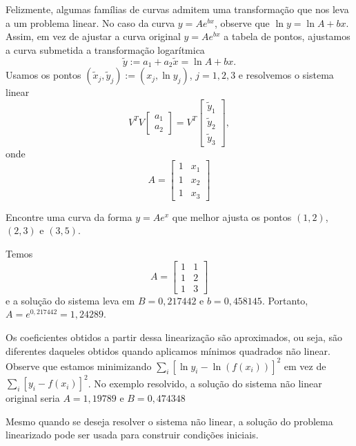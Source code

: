 Felizmente, algumas famílias de curvas admitem uma transformação que nos leva a um problema linear. No caso da curva $y=Ae^{bx}$, observe que $\ln y=\ln A+bx$. Assim, em vez de ajustar a curva original $y=Ae^{bx}$ a tabela de pontos, ajustamos a curva submetida a transformação logarítmica
$$
\tilde y:=a_1+a_2 \tilde x=\ln A+bx.
$$
Usamos os pontos $(\tilde x_j,\tilde y_j):=(x_j,\ln y_j)$, $j=1,2,3$ e resolvemos o sistema linear
$$
V^T V \left[\begin{array}{c} a_1\\a_2 \end{array}\right]=V^T\left[\begin{array}{c}\tilde{y}_1\\\tilde{y}_2\\\tilde{y}_3 \end{array}\right],
$$
onde
$$
A=\left[\begin{array}{cc} 1&x_1\\1&x_2\\1&x_3 \end{array}\right]
$$
\begin{ex}Encontre uma curva da forma $y=Ae^x$ que melhor ajusta os pontos $(1, 2)$, $(2, 3)$ e $(3, 5)$.
\end{ex}
Temos
$$
A=\left[\begin{array}{cc} 1&1\\1&2\\1&3 \end{array}\right]
$$
e a solução do sistema leva em $B=0,217442$ e $b=0,458145$. Portanto, $A=e^{0,217442}=1,24289$.

\begin{obs}
Os coeficientes obtidos a partir dessa linearização são aproximados, ou seja, são diferentes daqueles obtidos quando aplicamos mínimos quadrados não linear. Observe que estamos minimizando $\displaystyle\sum_i [\ln y_i -\ln (f(x_i))]^2$ em vez de $\displaystyle\sum_i [ y_i -f(x_i)]^2$. No exemplo resolvido, a solução do sistema não linear original seria $A=1,19789$ e $B=0,474348$
\end{obs}

\begin{obs}
Mesmo quando se deseja resolver o sistema não linear, a solução do problema linearizado pode ser usada para construir condições iniciais.
\end{obs}


